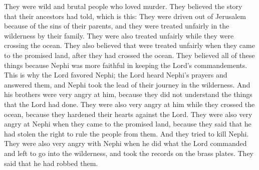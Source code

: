 They were wild and brutal people who loved murder. They believed the story that their ancestors had told, which is this: They were driven out of Jerusalem because of the sins of their parents, and they were treated unfairly in the wilderness by their family. They were also treated unfairly while they were crossing the ocean.
\bverse \iffalse And again, that they were wronged while in the land of their first inheritance, after they had crossed the sea, and all this because that Nephi was more faithful in keeping the commandments of the Lord--therefore he was favored of the Lord, for the Lord heard his prayers and answered them, and he took the lead of their journey in the wilderness. \fi
They also believed that were treated unfairly when they came to the promised land, after they had crossed the ocean. They believed all of these things because Nephi was more faithful in keeping the Lord's commandements. This is why the Lord favored Nephi; the Lord heard Nephi's prayers and answered them, and Nephi took the lead of their journey in the wilderness.
\bverse \iffalse And his brethren were wroth with him because they understood not the dealings of the Lord; they were also wroth with him upon the waters because they hardened their hearts against the Lord. \fi
And his brothers were very angry at him, because they did not understand the things that the Lord had done. They were also very angry at him while they crossed the ocean, because they hardened their hearts against the Lord.
\bverse \iffalse And again, they were wroth with him when they had arrived in the promised land, because they said that he had taken the ruling of the people out of their hands; and they sought to kill him. \fi
They were also very angry at Nephi when they came to the promised land, because they said that he had stolen the right to rule the people from them. And they tried to kill Nephi.
\bverse \iffalse And again, they were wroth with him because he departed into the wilderness as the Lord had commanded him, and took the records which were engraven on the plates of brass, for they said that he robbed them. \fi
They were also very angry with Nephi when he did what the Lord commanded and left to go into the wilderness, and took the records on the brass plates. They said that he had robbed them.
\bverse \iffalse And thus they have taught their children that they should hate them, and that they should murder them, and that they should rob and plunder them, and do all they could to destroy them; therefore they have an eternal hatred towards the children of Nephi. \fi
